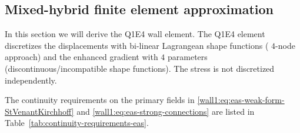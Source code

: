 
\subsection{Mixed-hybrid finite element approximation}

In this section we will derive the Q1E4 wall element. The Q1E4 element
discretizes the displacements with bi-linear Lagrangean shape functions (\ie{}
$4$-node approach) and the enhanced gradient with $4$ parameters
(discontinuous/incompatible shape functions). The stress
is not discretized independently.


The continuity requirements on the primary fields in
\eqref{wall1:eq:eas-weak-form-StVenantKirchhoff} and 
\eqref{wall1:eq:eas-strong-connections} are listed in
Table~\ref{tab:continuity-requirements-eas}. 

